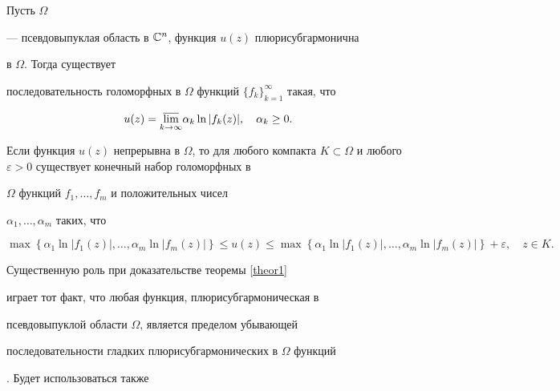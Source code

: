\begin{thm}


\label{theor2}


Пусть $\Omega$ 


--- псевдовыпуклая область в $\Bbb C^n$, функция $u(z)$ плюрисубгармонична 


в $\Omega$. Тогда существует                        


последовательность голоморфных в $\Omega$ функций $\{f_k\}_{k=1}^


{\infty}$ такая, что 


$$


u(z)=\underset{k\to\infty}{\varlimsup}{}\alpha_k\ln|f_k(z)|, \quad 


\alpha_k\ge 0.


$$


Если функция $u(z)$ непрерывна в $\Omega$, то для любого компакта $K\subset 


\Omega$ и любого $\varepsilon>0$ существует конечный набор голоморфных в 


$\Omega$ функций $f_1,\dotsc,f_m$ и положительных чисел 


$\alpha_1,\dotsc,\alpha_m$ таких, что 


$$


\max\left\{\alpha_1\ln|f_1(z)|,\dotsc,\alpha_m\ln|f_m(z)|\right\}\le 


u(z)\le 


\max\left\{\alpha_1\ln|f_1(z)|,\dotsc,\alpha_m\ln|f_m(z)|\right\}


+\varepsilon,\quad z\in K.


$$


\end{thm}





Существенную роль при доказательстве теоремы \ref{theor1}


играет тот факт, что любая функция, плюрисубгармоническая в        


псевдовыпуклой области $\Omega$, является пределом убывающей 


последовательности гладких плюрисубгармонических в $\Omega$ функций 


\cite{Sadul2}. Будет использоваться также






